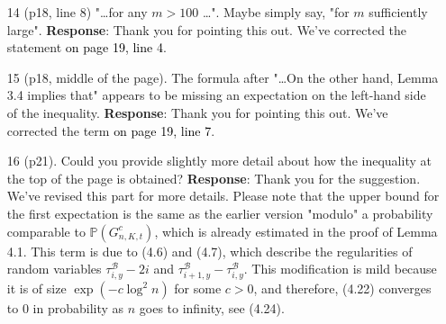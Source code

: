 \documentclass[11pt,a4paper]{article}
\numberwithin{equation}{section}
\newcommand{\PL}[2]{\textcolor{black}{on page {#1}, line {#2}}}
\begin{document}
\begin{itemize}
		
		\item [14] (p18, line 8) "\dots for any $m > 100$ \dots ". Maybe simply say, "for $m$ sufficiently large".
		\subitem \textbf{Response}:  Thank you for pointing this out.  We've corrected the statement \PL{19}{4}.
		
		
		
		\item [15] (p18, middle of the page). The formula after "\dots On the other hand, Lemma 3.4 implies that" appears to be missing an expectation on the left-hand side of the inequality.
		\subitem \textbf{Response}:  Thank you for pointing this out. We've corrected the term \PL{19}{7}.
		
		\item [16] (p21). Could you provide slightly more detail about how the inequality at the top of the page is obtained?
		\subitem \textbf{Response}: Thank you for the suggestion. We've revised this part for more details. Please note that the upper bound for the first expectation is the same as the earlier version "modulo" a probability comparable to $\mathbb{P}(G^c_{n,K,t}) $, which is already estimated in the proof of Lemma 4.1. This term is due to (4.6) and (4.7), which describe the regularities of random variables $\tau^{\mathcal{B}}_{i,y}-2i $ and $\tau^{\mathcal{B}}_{i+1,y}- \tau^{\mathcal{B}}_{i,y}$. This modification is mild because it is of size $\exp(- c \log^2 n) $ for some $c>0$, and therefore, (4.22) converges to $0$ in probability as $n$ goes to infinity, see (4.24).
		
		
	\end{itemize}
\end{document}

